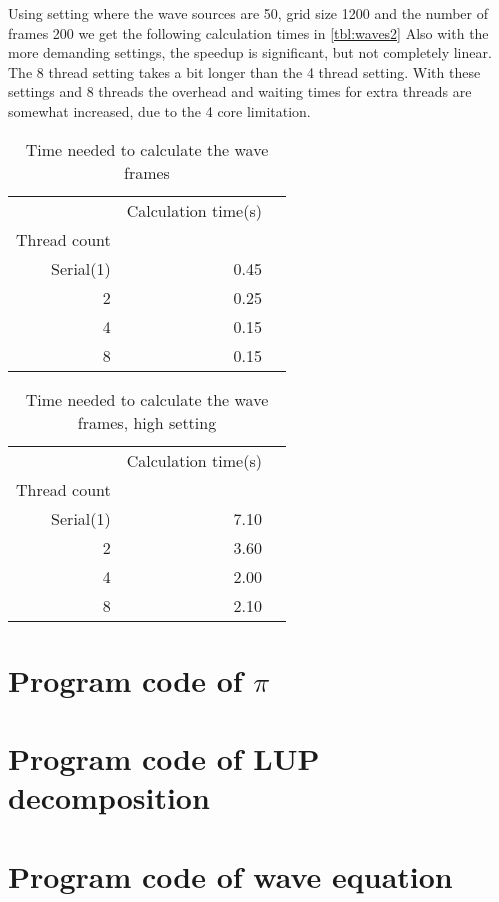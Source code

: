 \documentclass[a4paper]{article}
\begin{document}
\begin{enumerate}[(a)]
Using setting where the wave sources are 50, grid size 1200 and the number of frames 200 we get the following calculation times in \autoref{tbl:waves2}
Also with the more demanding settings, the speedup is significant, but not completely linear. The 8 thread setting takes a bit longer than the 4 thread setting. With these settings and 8 threads the overhead and waiting times for extra threads are somewhat increased, due to the 4 core limitation.
\end{enumerate}

\begin{table}[h!]
	\centering
	\caption{Time needed to calculate the wave frames}
	\label{tbl:waves1}
	\begin{tabular}{r|r|r}
		& Calculation time(s) \\
		Thread count \\ \cline{2-3}
		Serial(1) & 0.45  \\
		2 & 0.25  \\
		4 & 0.15  \\
		8 & 0.15  \\
		
	\end{tabular}
\end{table}

\begin{table}
	\centering
	\caption{Time needed to calculate the wave frames, high setting}
	\label{tbl:waves2}
	\begin{tabular}{r|r|r}
		& Calculation time(s) \\
		Thread count \\ \cline{2-3}
		Serial(1) & 7.10  \\
		2 & 3.60  \\
		4 & 2.00 \\
		8 & 2.10  \\
		
	\end{tabular}
\end{table}

\newpage
\appendix
\section {Program code of $\pi$}


\section{Program code of LUP decomposition}


\section {Program code of wave equation}
\label{app:wavePar}

\end{document}
